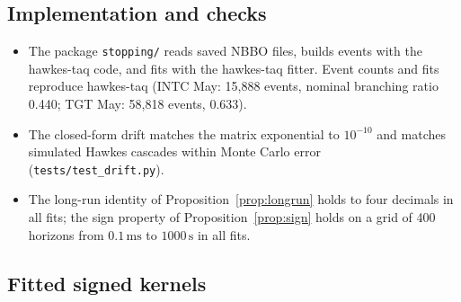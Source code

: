 \documentclass[11pt]{article}
\theoremstyle{definition}
\theoremstyle{remark}
\newcommand{\ms}{\,\text{ms}}
\newcommand{\sx}{\,\text{s}}
\newcommand{\file}[1]{\texttt{#1}}
\begin{document}
\subsection{Implementation and checks}

\begin{itemize}
\item The package \file{stopping/} reads saved NBBO files, builds events with the hawkes-taq code, and fits with the hawkes-taq fitter. Event counts and fits reproduce hawkes-taq (INTC May: 15,888 events, nominal branching ratio 0.440; TGT May: 58,818 events, 0.633).
\item The closed-form drift matches the matrix exponential to $10^{-10}$ and matches simulated Hawkes cascades within Monte Carlo error (\file{tests/test\_drift.py}).
\item The long-run identity of Proposition~\ref{prop:longrun} holds to four decimals in all fits; the sign property of Proposition~\ref{prop:sign} holds on a grid of 400 horizons from $0.1\ms$ to $1000\sx$ in all fits.
\end{itemize}

\subsection{Fitted signed kernels}
\label{sec:res-kernels}
\end{document}
